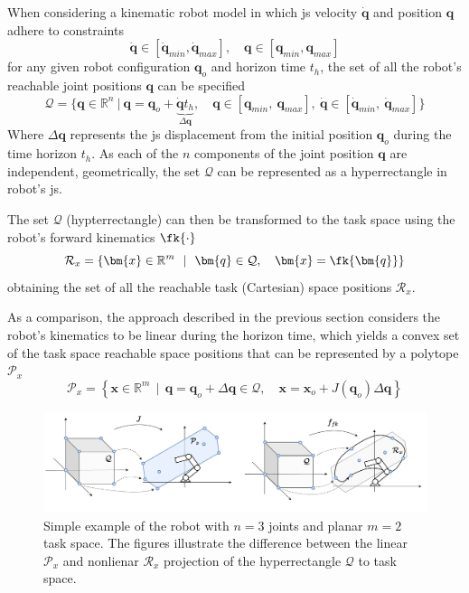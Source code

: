 When considering a kinematic robot model in which \gls{js} velocity $\dot{\bm{q}}$ and position $\bm{q}$ adhere to constraints
\begin{equation}
   \dot{\bm{q}} \in \left[\dot{\bm{q}}_{min},\dot{\bm{q}}_{max}\right], \quad 
   \bm{q} \in \left[{\bm{q}}_{min},{\bm{q}}_{max}\right]
\end{equation}
for any given robot configuration $\bm{q}_o$ and horizon time $t_h$, the set of all the robot's reachable joint positions $\bm{q}$ can be specified
\begin{equation}
\mathcal{Q}= \{ \bm{q}\in\mathbb{R}^n ~|~ \bm{q} = \bm{q}_o + \underbrace{\dot{\bm{q}}t_h}_{\Delta \bm{q}}, \quad \bm{q}\in[\bm{q}_{min}, ~ \bm{q}_{max}],~ \dot{\bm{q}}\in[\dot{\bm{q}}_{min}, ~ \dot{\bm{q}}_{max}] \}
\end{equation}
Where $\Delta \bm{q}$ represents the \gls{js} displacement from the initial position $\bm{q}_o$ during the time horizon $t_h$. As each of the $n$ components of the joint position $\bm{q}$ are independent, geometrically, the set $\mathcal{Q}$ can be represented as a hyperrectangle in robot's \gls{js}. 

The set $\mathcal{Q}$ (hypterrectangle) can then be transformed to the task space using the robot's forward kinematics $\fk{\cdot}$
\begin{equation}
    \mathcal{R}_x= \left\{ \bm{x} \in \mathbb{R}^m~~|~~ {\bm{q}} \in \mathcal{Q}, \quad
    \bm{x} =\fk{\bm{q}}\right\}
\end{equation}
obtaining the set of all the reachable task (Cartesian) space positions $\mathcal{R}_x$.

As a comparison, the approach described in the previous section considers the robot's kinematics to be linear during the horizon time, which yields a convex set of the task space reachable space positions that can be represented by a polytope $\mathcal{P}_x$
\begin{equation}
    \mathcal{P}_x= \left\{ \bm{x} \in \mathbb{R}^m~~|~~ \bm{q} = \bm{q}_o + \Delta \bm{q} \in {\mathcal{Q}}, \quad 
    \bm{x} = \bm{x}_o + J(\bm{q}_o)\Delta \bm{q}\right\}
\end{equation}

\begin{figure}[!t]
    \centering
    \includegraphics[width=\textwidth]{Papers/images/curved_space_algo_new.pdf}
    \caption{Simple example of the robot with $n=3$ joints and planar $m=2$ task space. The figures illustrate the difference between the linear $\mathcal{P}_x$ and nonlienar $\mathcal{R}_x$ projection of the hyperrectangle $\mathcal{Q}$ to task space.}
    \label{fig:curved_space_algo_new}
\end{figure}


